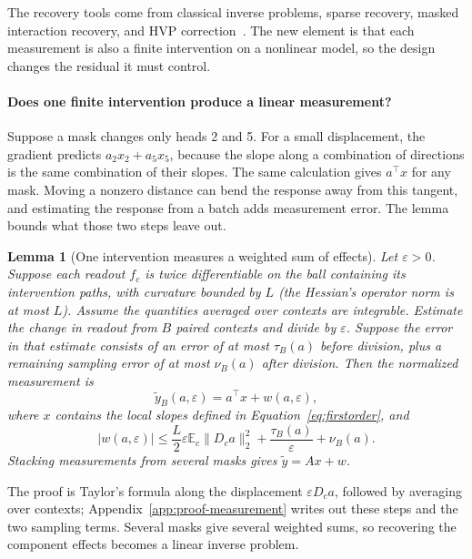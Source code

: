 \documentclass[sigconf,10pt,nonacm,balance=false]{acmart}
\newcommand{\eps}{\varepsilon}
\newcommand{\E}{\mathbb{E}}
\newtheorem{lemma}{Lemma}
\begin{document}
The recovery tools come from classical inverse problems, sparse recovery, masked interaction recovery, and HVP correction~\cite{bair2026compressed,kang2025spex,butler2025proxyspex,zhang2026lies}. The new element is that each measurement is also a finite intervention on a nonlinear model, so the design changes the residual it must control.

\paragraph{Does one finite intervention produce a linear measurement?}
Suppose a mask changes only heads 2 and 5. For a small displacement, the gradient predicts $a_2x_2+a_5x_5$, because the slope along a combination of directions is the same combination of their slopes. The same calculation gives $a^\top x$ for any mask. Moving a nonzero distance can bend the response away from this tangent, and estimating the response from a batch adds measurement error. The lemma bounds what those two steps leave out.

\begin{lemma}[One intervention measures a weighted sum of effects]\label{lem:measurement-reduction}
Let $\eps>0$. Suppose each readout $f_c$ is twice differentiable on the ball containing its intervention paths, with curvature bounded by $L$ (the Hessian's operator norm is at most $L$). Assume the quantities averaged over contexts are integrable. Estimate the change in readout from $B$ paired contexts and divide by $\eps$. Suppose the error in that estimate consists of an error of at most $\tau_B(a)$ before division, plus a remaining sampling error of at most $\nu_B(a)$ after division. Then the normalized measurement is
\begin{equation}
    \widetilde y_B(a,\eps)
    =
    a^\top x+w(a,\eps),
\end{equation}
where $x$ contains the local slopes defined in Equation~\eqref{eq:firstorder}, and
\begin{equation}
    |w(a,\eps)| \le \frac{L}{2}\eps\E_c\|D_ca\|_2^2
    + \frac{\tau_B(a)}{\eps}+\nu_B(a).
\end{equation}
Stacking measurements from several masks gives $\widetilde y=Ax+w$.
\end{lemma}

The proof is Taylor's formula along the displacement $\eps D_ca$, followed by averaging over contexts; Appendix~\ref{app:proof-measurement} writes out these steps and the two sampling terms. Several masks give several weighted sums, so recovering the component effects becomes a linear inverse problem.
\end{document}
